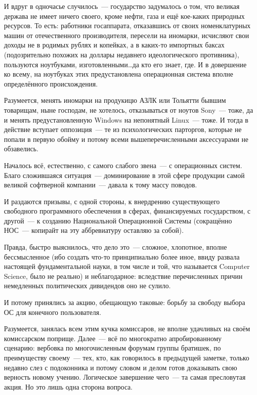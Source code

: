 И вдруг в одночасье случилось~--- государство задумалось о том, что великая держава не имеет ничего своего, кроме нефти, газа и ещё кое-каких природных ресурсов. То есть: работники госаппарата, отказавшись от своих номенклатурных машин от отечественного производителя, пересели на иномарки, исчисляют свои доходы не в родимых рублях и копейках, а в каких-то импортных баксах (подозрительно похожих на доллары недавнего идеологического противника), пользуются ноутбуками, изготовленными\dots да кто его знает, где. И в довершение ко всему, на ноутбуках этих предустановлена операционная система вполне определённого происхождения.

Разумеется, менять иномарки на продукицю АЗЛК или Тольятти бывшим товарищам, ныне господам, не хотелось, отказываться от ноутов Sony~--- тоже, да и менять предустановленную Windows на непонятный Linux~--- тоже. И тогда в действие вступает оппозиция~--- те из психологических парторгов, которые не попали в первую обойму и потому всеми вышеперечисленными аксессуарами не обзавелись.

Началось всё, естественно, с самого слабого звена~--- с операционных систем. Благо сложившаяся ситуация~--- доминирование в этой сфере продукции самой великой софтверной компании~--- давала к тому массу поводов.

И раздаются призывы, с одной стороны, к внердрению существующего свободного программного обеспечения в сферах, финансируемых государством, с другой~--- к созданию Национальной Операционной Системы (сокращённо НОС~--- копирайт на эту аббревиатуру оставляю за собой).

Правда, быстро выяснилось, что дело это~--- сложное, хлопотное, вполне бессмысленное (ибо создать что-то принципиально более иное, ввиду развала настоящей фундаментальной науки, в том числе и той, что называется Computer Science, было не реально) и неблагодарное: вследствие перечисленных причин немедленных политических дивидендов оно не сулило.

И потому принялись за акцию, обещающую таковые: борьбу за свободу выбора ОС для конечного пользователя.

Разумеется, занялась всем этим кучка комиссаров, не вполне удачливых на своём комиссарском поприще. Далее~--- всё по многократно апробированному сценарию: вербовка по многочисленным форумам группы братишек, по преимуществу своему~--- тех, кто, как говорилось в предыдущей заметке, только недавно слез с подоконника и потому словом и делом готов доказывать свою верность новому учению. Логическое завершение чего~--- та самая пресловутая акция. Но это лишь одна сторона вопроса.

